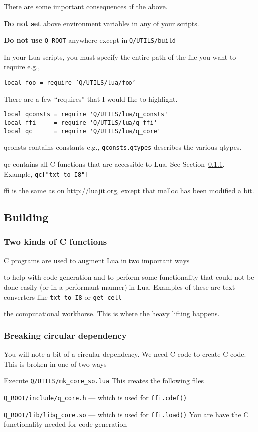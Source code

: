 There are some important consequences of the above. 
\be
\item {\bf Do  not set} above environment variables in any of your scripts.
\item {\bf Do not use} \verb+Q_ROOT+ anywhere except in \verb+Q/UTILS/build+
\item In your Lua scripts, you must specify the entire path of the file you want
to require e.g.,
\begin{center}
{\tt local foo = require 'Q/UTILS/lua/foo' }
\end{center}
\item There are a few ``requires'' that I would like to highlight.
\begin{verbatim}
local qconsts = require 'Q/UTILS/lua/q_consts'
local ffi     = require 'Q/UTILS/lua/q_ffi'
local qc      = require 'Q/UTILS/lua/q_core'
\end{verbatim}
\be
\item qconsts contains constants e.g., \verb+qconsts.qtypes+ describes the
various qtypes.
\item qc contains all C functions that are accessible to Lua. See  Section~\ref{two_kinds_c_functions}. Example, \verb+qc["txt_to_I8"]+
\item ffi is the same as on \url{http://luajit.org}, except that malloc has been
modified a bit.
\ee
\ee


\subsection{Building}

\subsubsection{Two kinds of C functions}
\label{two_kinds_c_functions}
C programs are used to augment Lua in two important ways
\be
\item to help with code generation and to perform some functionality that 
could not be done easily (or in a performant manner) in Lua. Examples
of these are text converters like \verb+txt_to_I8+ or \verb+get_cell+
\item the computational workhorse. This is where the heavy lifting happens.
\ee

\subsubsection{Breaking circular dependency}
You will note a bit of a circular dependency. We need C code to create
C code.  This is broken in one of two ways
\be
\item Execute \verb+Q/UTILS/mk_core_so.lua+ This creates the following 
files 
\be
\item \verb+Q_ROOT/include/q_core.h+ --- which is used for \verb+ffi.cdef()+
\item \verb+Q_ROOT/lib/libq_core.so+ --- which is used for \verb+ffi.load()+
\ee
You are have the C functionality needed for code generation

